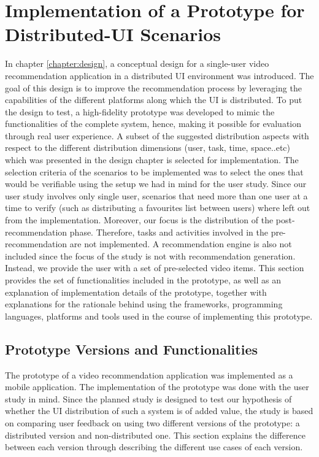 \chapter{Implementation of a Prototype for Distributed-UI Scenarios}\label{chapter:impl}
In chapter \ref{chapter:design}, a conceptual design for a single-user video recommendation application in a distributed UI environment was introduced. The goal of this design is to improve the recommendation process by leveraging the capabilities of the different platforms along which the UI is distributed. To put the design to test, a high-fidelity prototype was developed to mimic the functionalities of the complete system, hence, making it possible for evaluation through real user experience. A subset of the suggested distribution aspects with respect to the different distribution dimensions (user, task, time, space..etc) which was presented in the design chapter is selected for implementation. The selection criteria of the scenarios to be implemented was to select the ones that would be verifiable using the setup we had in mind for the user study. Since our user study involves only single user, scenarios that need more than  one user at a time to verify (such as distributing a favourites list between users) where left out from the implementation. Moreover, our focus is the distribution of the post-recommendation phase. Therefore, tasks and activities involved in the pre-recommendation are not implemented. A recommendation engine is also not included since the focus of the study is not with recommendation generation. Instead, we provide the user with a set of pre-selected video items. This section provides the set of functionalities included in the prototype, as well as an explanation of implementation details of the prototype, together with explanations for the rationale behind using the frameworks, programming languages, platforms and tools used in the course of implementing this prototype. 
 
\section{Prototype Versions and Functionalities}
The prototype of a video recommendation application was implemented as a mobile application. The implementation of the prototype was done with the user study in mind. Since the planned study is designed to test our hypothesis of whether the UI distribution of such a system is of added value, the study is based on comparing user feedback on using two different versions of the prototype: a distributed version and non-distributed one. This section explains the difference between each version through describing the different use cases of each version.

